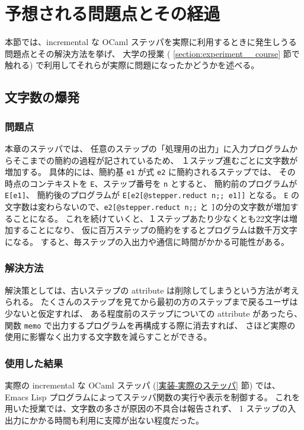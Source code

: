 \section{予想される問題点とその経過}
本節では、incremental な OCaml ステッパを実際に利用するときに発生しうる問題点とその解決方法を挙げ、
大学の授業 ( \ref{section:experiment__course} 節で触れる) で利用してそれらが実際に問題になったかどうかを述べる。

\subsection{文字数の爆発}

\subsubsection{問題点}

本章のステッパでは、
任意のステップの「処理用の出力」に入力プログラムからそこまでの簡約の過程が記されているため、
１ステップ進むごとに文字数が増加する。
具体的には、簡約基 \texttt{e1} が式 \texttt{e2} に簡約されるステップでは、
その時点のコンテキストを \texttt{E}、ステップ番号を \texttt{n} とすると、
簡約前のプログラムが \texttt{E[e1]}、
簡約後のプログラムが \texttt{E[e2[@stepper.reduct n;; e1]]} となる。
\texttt{E} の文字数は変わらないので、\texttt{e2[@stepper.reduct n;;}
と \texttt{]}の分の文字数が増加することになる。
これを続けていくと、１ステップあたり少なくとも22文字は増加することになり、
仮に百万ステップの簡約をするとプログラムは数千万文字になる。
すると、毎ステップの入出力や通信に時間がかかる可能性がある。

\subsubsection{解決方法}

解決策としては、古いステップの attribute は削除してしまうという方法が考えられる。
たくさんのステップを見てから最初の方のステップまで戻るユーザは少ないと仮定すれば、
ある程度前のステップについての attribute があったら、
関数 \texttt{memo} で出力するプログラムを再構成する際に消去すれば、
さほど実際の使用に影響なく出力する文字数を減らすことができる。

\subsubsection{使用した結果}

実際の incremental な OCaml ステッパ (\ref{実装-実際のステッパ} 節) では、
Emacs Lisp プログラムによってステッパ関数の実行や表示を制御する。
これを用いた授業では、文字数の多さが原因の不具合は報告されず、
1 ステップの入出力にかかる時間も利用に支障が出ない程度だった。

